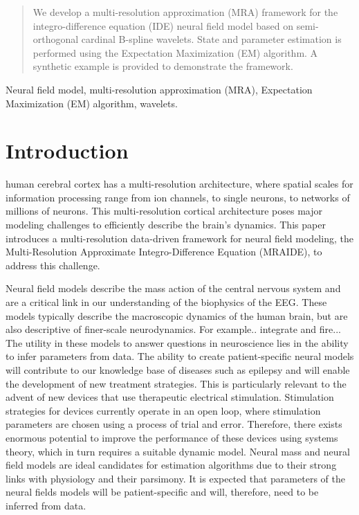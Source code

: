 \documentclass[11pt,draftcls,onecolumn,peerreview]{IEEEtran}
\begin{document}
\begin{abstract}
We develop a multi-resolution approximation (MRA) framework for the integro-difference equation (IDE) neural field model based on semi-orthogonal cardinal B-spline wavelets. State and parameter estimation is performed using the Expectation Maximization (EM) algorithm. A synthetic example is provided
to demonstrate the framework.
\end{abstract}
 \begin{IEEEkeywords}
  Neural field model, multi-resolution approximation (MRA), Expectation Maximization (EM) algorithm, wavelets.
  \end{IEEEkeywords}
%
\IEEEpeerreviewmaketitle


\section{Introduction}
 human cerebral cortex has a multi-resolution architecture, where spatial scales for information processing range from ion channels, to single neurons, to networks of millions of neurons. This multi-resolution cortical architecture poses major modeling challenges to efficiently describe the brain's dynamics. This paper introduces a multi-resolution data-driven framework for neural field modeling, the Multi-Resolution Approximate Integro-Difference Equation (MRAIDE), to address this challenge. 

Neural field models describe the mass action of the central nervous system and are a critical link in our understanding of the biophysics of the EEG. These models typically describe the macroscopic dynamics of the human brain, but are also descriptive of finer-scale neurodynamics. For example.. integrate and fire... The utility in these models to answer questions in neuroscience lies in the ability to infer parameters from data. The ability to create patient-specific neural models will contribute to our knowledge base of diseases such as epilepsy and will enable the development of new treatment strategies. This is particularly relevant to the advent of new devices that use therapeutic electrical stimulation. Stimulation strategies for devices currently operate in an open loop, where stimulation parameters are chosen using a process of trial and error. Therefore, there exists enormous potential to improve the performance of these devices using systems theory, which in turn requires a suitable dynamic model. Neural mass and neural field models are ideal candidates for estimation algorithms due to their strong links with physiology and their parsimony. It is expected that parameters of the neural fields models will be patient-specific and will, therefore, need to be inferred from data.
\end{document}
